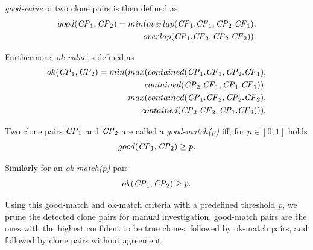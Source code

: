 \documentclass{sig-alternate-05-2015}
\newcommand{\squeezeup}{\vspace{-0.5mm}}
\begin{document}
\textit{good-value} of two clone pairs is then defined as
\begin{align*}
	good(\textrm{\textit{CP}}_1, \textrm{\textit{CP}}_2) = min(overlap(\textrm{\textit{CP}}_1.\textrm{\textit{CF}}_1,\textrm{\textit{CP}}_2.\textrm{\textit{CF}}_1), \\ overlap(\textrm{\textit{CP}}_1.\textrm{\textit{CF}}_2,\textrm{\textit{CP}}_2.\textrm{\textit{CF}}_2)).
\end{align*}

Furthermore, \textit{ok-value} is defined as
\begin{align*}
	ok(\textrm{\textit{CP}}_1,\textrm{\textit{CP}}_2) = min(max(contained(\textrm{\textit{CP}}_1.\textrm{\textit{CF}}_1,\textrm{\textit{CP}}_2.\textrm{\textit{CF}}_1), \\ contained(\textrm{\textit{CP}}_2.\textrm{\textit{CF}}_1,\textrm{\textit{CP}}_1.\textrm{\textit{CF}}_1)),
	\\ max(contained(\textrm{\textit{CP}}_1.\textrm{\textit{CF}}_2,\textrm{\textit{CP}}_2.\textrm{\textit{CF}}_2), \\contained(\textrm{\textit{CP}}_2.\textrm{\textit{CF}}_2,\textrm{\textit{CP}}_1.\textrm{\textit{CF}}_2))).
\end{align*}

Two clone pairs $\textrm{\textit{CP}}_1$ and $\textrm{\textit{CP}}_2$ are called a \textit{good-match(p)} iff, for $p \in [0,1]$ holds 
\begin{equation}
good(\textrm{\textit{CP}}_1,\textrm{\textit{CP}}_2) \geq p.
\end{equation}

Similarly for an \textit{ok-match(p)} pair
\begin{equation}
ok(\textrm{\textit{CP}}_1,\textrm{\textit{CP}}_2) \geq p.
\end{equation}

Using this good-match and ok-match criteria with a predefined threshold \textit{p}, we prune the detected clone pairs for manual investigation. good-match pairs are the ones with the highest confident to be true clones, followed by ok-match pairs, and followed by clone pairs without agreement.
\end{document}
